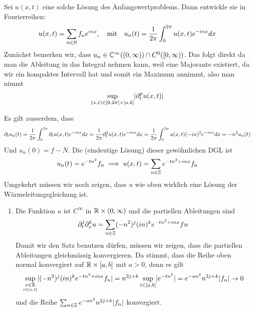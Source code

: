 Sei $u(x,t)$ eine solche Lösung des Anfangswertproblems. Dann entwickle sie in Fourierreihen:
\begin{align*}
	u(x,t) = \sum_{n \in \mathbb{N}} f_n e^{inx}, \quad \text{mit} \quad u_n(t) = \frac{1}{2\pi} \int_{0}^{2\pi} u(x,t) e^{-inx}dx
\end{align*}
Zunächst bemerken wir, dass $u_n \in \mathbb{C}^{\infty}((0,\infty)) \cap C^0([0,\infty))$. Das folgt direkt da man die Ableitung in das Integral nehmen kann, weil eine Majorante existiert, da wir ein kompaktes Intervall hat und somit ein Maximum annimmt, also man nimmt 
\begin{align*}
	\sup_{(x,t) \in [0,2\pi] \times [a,b]} \abs{\del_t^p u(x,t)}
\end{align*}

Es gilt ausserdem, dass
\begin{align*}
	\partial_t u_n(t) = \frac{1}{2\pi} \int_{0}^{2\pi} \partial_t u(x,t) e^{-inx}dx = \frac{1}{2\pi} \partial_t^2 u(x,t) e^{-inx}dx = \frac{1}{2\pi}\int_{0}^{2\pi} u(x,t) (-in)^2 e^{-inx}dx = -n^2u_n(t)
\end{align*}
Und $u_n(0) = f-N$. Die (eindeutige Lösung) dieser gewöhnlichen DGL ist
\begin{align*}
	u_n(t) = e^{-tn^2}f_n \implies u(x,t) = \sum_{n \in \mathbb{Z}} e^{-tn^2 + inx} f_n
\end{align*}
Umgekehrt müssen wir noch zeigen, dass $u$ wie oben wirklich eine Lösung der Wärmeleitungsgleichung ist.
\begin{enumerate}
	\item Die Funktion $u$ ist $C^{\infty}$ in $\mathbb{R} \times (0,\infty)$ und die partiellen Ableitungen sind
		\begin{align*}
			\partial_t^j \partial_x^k u = \sum_{n \in \mathbb{Z}} (-n^2)^j (in)^k e^{-tn^2 + inx}fn
		\end{align*}
		Damit wir den Satz benutzen dürfen, müssen wir zeigen, dass die partiellen Ableitungen gleichmässig konvergieren. Da stimmt, dass die Reihe oben normal konvergiert auf $\mathbb{R} \times [a,b]$ mit $a > 0$, denn es gilt
		\begin{align*}
		\sup_{\underset{t \in [a,b]}{x \in \R}} \abs{(-n^2)^j (in)^k e^{-tn^2 + inx}f_n} = n^{2j+k}\sup_{t \in [a,b]} \abs{e^{-tn^2}} = e^{-an^2} n^{2j+k} \abs{f_n} \to 0
		\end{align*}
		und die Reihe $\sum_{n \in \mathbb{Z}} e^{-an^2}n^{2j +k} \vert f_n\vert$ konvergiert.
\end{enumerate}



